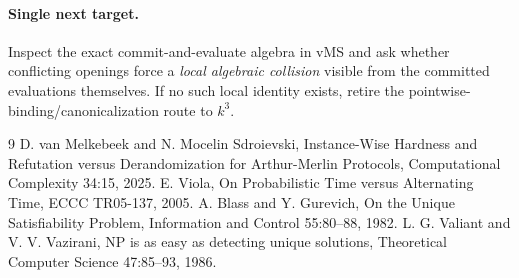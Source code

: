 \documentclass[11pt]{article}
\begin{document}
\paragraph{Single next target.}
Inspect the exact commit-and-evaluate algebra in vMS and ask whether conflicting openings force a \emph{local algebraic collision} visible from the committed evaluations themselves. If no such local identity exists, retire the pointwise-binding/canonicalization route to $k^3$.

\begin{thebibliography}{9}
 D. van Melkebeek and N. Mocelin Sdroievski, Instance-Wise Hardness and Refutation versus Derandomization for Arthur-Merlin Protocols, Computational Complexity 34:15, 2025.
 E. Viola, On Probabilistic Time versus Alternating Time, ECCC TR05-137, 2005.
 A. Blass and Y. Gurevich, On the Unique Satisfiability Problem, Information and Control 55:80--88, 1982.
 L. G. Valiant and V. V. Vazirani, NP is as easy as detecting unique solutions, Theoretical Computer Science 47:85--93, 1986.
\end{thebibliography}
\end{document}
